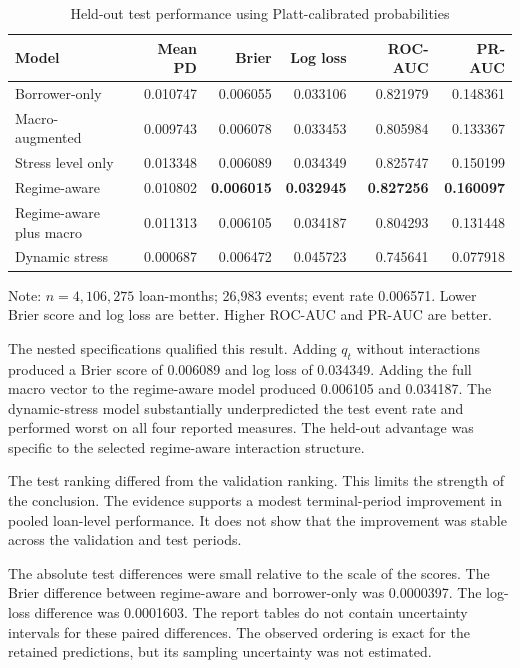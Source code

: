 \begin{table}[htbp]
\centering
\caption{Held-out test performance using Platt-calibrated probabilities}
\label{tab:test-metrics}
\small
\begin{tabular}{L{0.32\textwidth}rrrrr}
\toprule
Model & Mean PD & Brier & Log loss & ROC-AUC & PR-AUC \\
\midrule
Borrower-only & 0.010747 & 0.006055 & 0.033106 & 0.821979 & 0.148361 \\
Macro-augmented & 0.009743 & 0.006078 & 0.033453 & 0.805984 & 0.133367 \\
Stress level only & 0.013348 & 0.006089 & 0.034349 & 0.825747 & 0.150199 \\
Regime-aware & 0.010802 & \textbf{0.006015} & \textbf{0.032945} & \textbf{0.827256} & \textbf{0.160097} \\
Regime-aware plus macro & 0.011313 & 0.006105 & 0.034187 & 0.804293 & 0.131448 \\
Dynamic stress & 0.000687 & 0.006472 & 0.045723 & 0.745641 & 0.077918 \\
\bottomrule
\end{tabular}

\vspace{0.4em}
\parbox{0.94\textwidth}{\footnotesize Note: $n=4{,}106{,}275$ loan-months; 26,983 events; event rate 0.006571. Lower Brier score and log loss are better. Higher ROC-AUC and PR-AUC are better.}
\end{table}

The nested specifications qualified this result. Adding $q_t$ without interactions produced a Brier score of 0.006089 and log loss of 0.034349. Adding the full macro vector to the regime-aware model produced 0.006105 and 0.034187. The dynamic-stress model substantially underpredicted the test event rate and performed worst on all four reported measures. The held-out advantage was specific to the selected regime-aware interaction structure.

The test ranking differed from the validation ranking. This limits the strength of the conclusion. The evidence supports a modest terminal-period improvement in pooled loan-level performance. It does not show that the improvement was stable across the validation and test periods.

The absolute test differences were small relative to the scale of the scores. The Brier difference between regime-aware and borrower-only was 0.0000397. The log-loss difference was 0.0001603. The report tables do not contain uncertainty intervals for these paired differences. The observed ordering is exact for the retained predictions, but its sampling uncertainty was not estimated.

